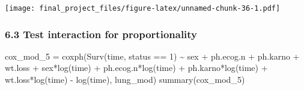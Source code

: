 \documentclass[
]{article}
\newenvironment{Shaded}{\begin{snugshade}}{\end{snugshade}}
\newcommand{\DecValTok}[1]{\textcolor[rgb]{0.00,0.00,0.81}{#1}}
\newcommand{\FunctionTok}[1]{\textcolor[rgb]{0.00,0.00,0.00}{#1}}
\newcommand{\NormalTok}[1]{#1}
\newcommand{\OtherTok}[1]{\textcolor[rgb]{0.56,0.35,0.01}{#1}}
\newcommand{\SpecialCharTok}[1]{\textcolor[rgb]{0.00,0.00,0.00}{#1}}
\begin{document}
\texttt{[image: final\_project\_files/figure-latex/unnamed-chunk-36-1.pdf]}

\hypertarget{test-interaction-for-proportionality}{%
\subsubsection{6.3 Test interaction for
proportionality}\label{test-interaction-for-proportionality}}

\begin{Shaded}
\begin{Highlighting}[]
\NormalTok{cox\_mod\_5 }\OtherTok{=} \FunctionTok{coxph}\NormalTok{(}\FunctionTok{Surv}\NormalTok{(time, status }\SpecialCharTok{==} \DecValTok{1}\NormalTok{) }\SpecialCharTok{\textasciitilde{}}\NormalTok{ sex }\SpecialCharTok{+}\NormalTok{ ph.ecog.n }\SpecialCharTok{+}\NormalTok{ ph.karno }\SpecialCharTok{+}\NormalTok{ wt.loss }\SpecialCharTok{+}
\NormalTok{                  sex}\SpecialCharTok{*}\FunctionTok{log}\NormalTok{(time) }\SpecialCharTok{+}\NormalTok{ ph.ecog.n}\SpecialCharTok{*}\FunctionTok{log}\NormalTok{(time) }\SpecialCharTok{+}\NormalTok{ ph.karno}\SpecialCharTok{*}\FunctionTok{log}\NormalTok{(time)  }\SpecialCharTok{+}\NormalTok{ wt.loss}\SpecialCharTok{*}\FunctionTok{log}\NormalTok{(time) }
                  \SpecialCharTok{{-}} \FunctionTok{log}\NormalTok{(time), }
\NormalTok{                  lung\_mod) }
\FunctionTok{summary}\NormalTok{(cox\_mod\_5)}
\end{Highlighting}
\end{Shaded}
\end{document}
